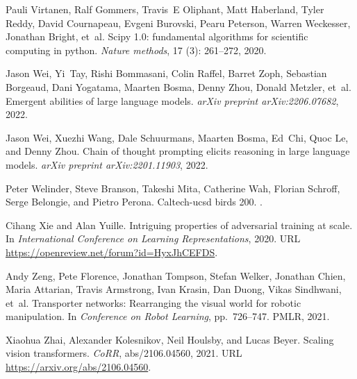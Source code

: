 \documentclass{article} %
\begin{document}
\begin{thebibliography}{61}
Pauli Virtanen, Ralf Gommers, Travis~E Oliphant, Matt Haberland, Tyler Reddy,
  David Cournapeau, Evgeni Burovski, Pearu Peterson, Warren Weckesser, Jonathan
  Bright, et~al.
\newblock Scipy 1.0: fundamental algorithms for scientific computing in python.
\newblock \emph{Nature methods}, 17 (3): 261--272, 2020.

Jason Wei, Yi~Tay, Rishi Bommasani, Colin Raffel, Barret Zoph, Sebastian
  Borgeaud, Dani Yogatama, Maarten Bosma, Denny Zhou, Donald Metzler, et~al.
\newblock Emergent abilities of large language models.
\newblock \emph{arXiv preprint arXiv:2206.07682}, 2022{}.

Jason Wei, Xuezhi Wang, Dale Schuurmans, Maarten Bosma, Ed~Chi, Quoc Le, and
  Denny Zhou.
\newblock Chain of thought prompting elicits reasoning in large language
  models.
\newblock \emph{arXiv preprint arXiv:2201.11903}, 2022{}.

Peter Welinder, Steve Branson, Takeshi Mita, Catherine Wah, Florian Schroff,
  Serge Belongie, and Pietro Perona.
\newblock Caltech-ucsd birds 200.
.

Cihang Xie and Alan Yuille.
\newblock Intriguing properties of adversarial training at scale.
\newblock In \emph{International Conference on Learning Representations}, 2020.
\newblock URL \url{https://openreview.net/forum?id=HyxJhCEFDS}.

Andy Zeng, Pete Florence, Jonathan Tompson, Stefan Welker, Jonathan Chien,
  Maria Attarian, Travis Armstrong, Ivan Krasin, Dan Duong, Vikas Sindhwani,
  et~al.
\newblock Transporter networks: Rearranging the visual world for robotic
  manipulation.
\newblock In \emph{Conference on Robot Learning}, pp.\  726--747. PMLR, 2021.

Xiaohua Zhai, Alexander Kolesnikov, Neil Houlsby, and Lucas Beyer.
\newblock Scaling vision transformers.
\newblock \emph{CoRR}, abs/2106.04560, 2021.
\newblock URL \url{https://arxiv.org/abs/2106.04560}.

\end{thebibliography}
\end{document}
